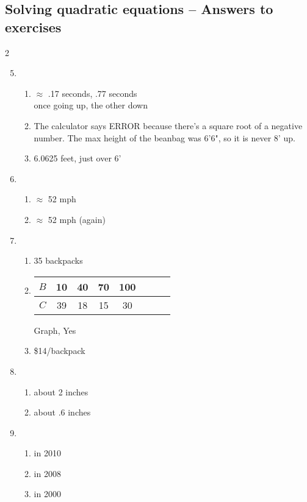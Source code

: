 \subsection {Solving quadratic equations -- Answers to exercises} %

\begin{multicols} {2}
\begin{enumerate}
\setcounter{enumi}{4}

\item %
\begin{enumerate}
\item $\approx$ .17 seconds, .77 seconds\\
once going up, the other down
\item The calculator says ERROR because there's a square root of a negative number.  The max height of the beanbag was 6'6", so it is never 8' up.
\item 6.0625 feet, just over 6'
\end{enumerate}

\item %
\begin{enumerate}
\item $\approx$ 52 mph
\item $\approx$ 52 mph (again)
\end{enumerate}

\item %
\begin{enumerate}
\item 35 backpacks
\item \begin{tabular} {|c| |c|c |c|c |c|c |c|}\hline
$B$ & 10 & 40 & 70 & 100\\ \hline
$C$ & 39 & 18 & 15 & 30  \\ \hline
\end{tabular}

Graph, Yes
\item \$14/backpack
\end{enumerate}

\item %
\begin{enumerate}
\item about 2 inches
\item about .6 inches
\end{enumerate}

\item %
\begin{enumerate}
\item in 2010
\item in 2008
\item in 2000
\end{enumerate}


\end{enumerate}
\end{multicols}
